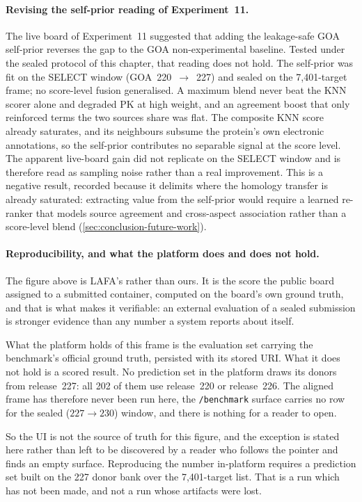 \paragraph{Revising the self-prior reading of Experiment~11.}
The live board of Experiment~11 suggested that adding the leakage-safe GOA
self-prior reverses the gap to the GOA non-experimental baseline. Tested under the
sealed protocol of this chapter, that reading does not hold. The self-prior was fit
on the SELECT window (GOA~220~$\to$~227) and sealed on the 7{,}401-target frame; no
score-level fusion generalised. A maximum blend never beat the KNN scorer alone and
degraded PK at high weight, and an agreement boost that only reinforced terms the
two sources share was flat. The composite KNN score already saturates, and its
neighbours subsume the protein's own electronic annotations, so the self-prior
contributes no separable signal at the score level. The apparent live-board gain
did not replicate on the SELECT window and is therefore read as sampling noise
rather than a real improvement. This is a negative result, recorded because it
delimits where the homology transfer is already saturated: extracting value from
the self-prior would require a learned re-ranker that models source agreement and
cross-aspect association rather than a score-level blend
(\cref{sec:conclusion-future-work}).

\paragraph{Reproducibility, and what the platform does and does not hold.}
The figure above is LAFA's rather than ours. It is the score the public board
assigned to a submitted container, computed on the board's own ground truth,
and that is what makes it verifiable: an external evaluation of a sealed
submission is stronger evidence than any number a system reports about itself.

What the platform holds of this frame is the evaluation set carrying the
benchmark's official ground truth, persisted with its stored URI. What it does
not hold is a scored result. No prediction set in the platform draws its donors
from release~227: all 202 of them use release~220 or release~226. The aligned
frame has therefore never been run here, the \texttt{/benchmark} surface carries
no row for the sealed ($227 \to 230$) window, and there is nothing for a reader
to open.

So the UI is not the source of truth for this figure, and the exception is
stated here rather than left to be discovered by a reader who follows the
pointer and finds an empty surface. Reproducing the number in-platform requires
a prediction set built on the 227 donor bank over the 7{,}401-target list. That
is a run which has not been made, and not a run whose artifacts were lost.


